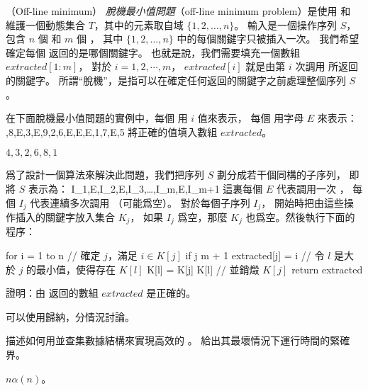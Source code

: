 \startPROBLEM
（Off-line minimum）
\emph{脫機最小值問題}（off-line minimum problem）是使用  和 
維護一個動態集合 $T$，其中的元素取自域 $\{1,2,\ldots,n\}$。
輸入是一個操作序列 $S$，包含 $n$ 個  和 $m$ 個 ，
其中 $\{1,2,\ldots,n\}$ 中的每個關鍵字只被插入一次。
我們希望確定每個  返回的是哪個關鍵字。
也就是說，我們需要填充一個數組 $extracted[1:m]$，
對於 $i=1,2,\cdots,m$， $extracted[i]$ 就是由第 $i$ 次調用  所返回的關鍵字。
所謂“脫機”，是指可以在確定任何返回的關鍵字之前處理整個序列 $S$。

\startigBase[a]\startitem
在下面脫機最小值問題的實例中，每個  用 $i$ 值來表示，
每個  用字母 $E$ 來表示：
,8,E,3,E,9,2,6,E,E,E,1,7,E,5
\stopformula
將正確的值填入數組 $extracted$。
\stopitem\stopigBase

\startANSWER
$4,3,2,6,8,1$
\stopANSWER

爲了設計一個算法來解決此問題，我們把序列 $S$ 劃分成若干個同構的子序列，
即將 $S$ 表示為：
\startformula
I_1,E,I_2,E,I_3,\ldots,I_m,E,I_{m+1}
\stopformula
這裏每個 $E$ 代表調用一次 ，
每個 $I_j$ 代表連續多次調用 （可能爲空）。
對於每個子序列 $I_j$，
開始時把由這些操作插入的關鍵字放入集合 $K_j$，
如果 $I_j$ 爲空，那麼 $K_j$ 也爲空。然後執行下面的程序：

\startCLRSCODE
for i = 1 to n
	// 確定 $j$，滿足 $i \in K[j]$
	if j \ne m + 1
		extracted[j] = i
		// 令 $l$ 是大於 $j$ 的最小值，使得存在 $K[l]$
		K[l] = K[j] \cup K[l]	// 並銷燬 $K[j]$
return extracted
\stopCLRSCODE

\startigBase[continue]\startitem
證明：由  返回的數組 $extracted$ 是正確的。
\stopitem\stopigBase

\startANSWER
可以使用歸納，分情況討論。
\stopANSWER

\startigBase[continue]\startitem
描述如何用並查集數據結構來實現高效的 。
給出其最壞情況下運行時間的緊確界。
\stopitem\stopigBase

\startANSWER
$n\alpha(n)$。
\stopANSWER

\stopPROBLEM

